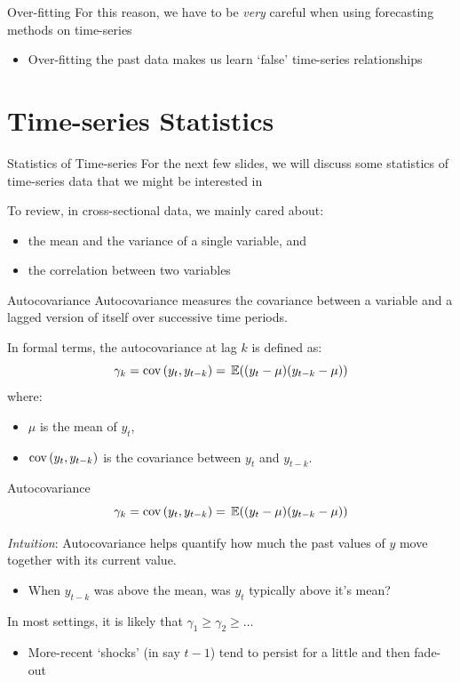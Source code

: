 \documentclass[aspectratio=169,t,11pt,table]{beamer}
\begin{document}
\begin{frame}{Over-fitting}
  For this reason, we have to be \emph{very} careful when using forecasting methods on time-series
  \begin{itemize}
    \item Over-fitting the past data makes us learn `false' time-series relationships
  \end{itemize}
\end{frame}


\section{Time-series Statistics}

\begin{frame}{Statistics of Time-series}
  For the next few slides, we will discuss some \alert{statistics} of time-series data that we might be interested in

  \bigskip
  To review, in cross-sectional data, we mainly cared about:
  \begin{itemize}
    \item the \alert{mean} and the \alert{variance} of a single variable, and
    \item the \alert{correlation} between two variables
  \end{itemize}
\end{frame}

\begin{frame}{Autocovariance}
  \alert{Autocovariance} measures the covariance between a variable and a lagged version of itself over successive time periods.

  \bigskip
  In formal terms, the autocovariance at lag $k$ is defined as:
  $$
    \gamma_k = \cov{y_t, y_{t-k}} = \expec{(y_t - \mu)(y_{t-k} - \mu)}
  $$
  where:
  \begin{itemize}
    \item $\mu$ is the mean of $y_t$,
    \item $\cov{y_t, y_{t-k}}$ is the covariance between $y_t$ and $y_{t-k}$.
  \end{itemize}
\end{frame}

\begin{frame}{Autocovariance}
  \vspace*{-\bigskipamount}
  $$
    \gamma_k = \cov{y_t, y_{t-k}} = \expec{(y_t - \mu)(y_{t-k} - \mu)}
  $$

  \emph{Intuition}: Autocovariance helps quantify how much the past values of $y$ move together with its current value.
  \begin{itemize}
    \item When $y_{t-k}$ was above the mean, was $y_t$ typically above it's mean?
  \end{itemize}

  \bigskip
  \pause
  In most settings, it is likely that $\gamma_1 \geq \gamma_2 \geq \dots$
  \begin{itemize}
    \item More-recent `shocks' (in say $t-1$) tend to persist for a little and then fade-out
  \end{itemize}
\end{frame}
\end{document}
